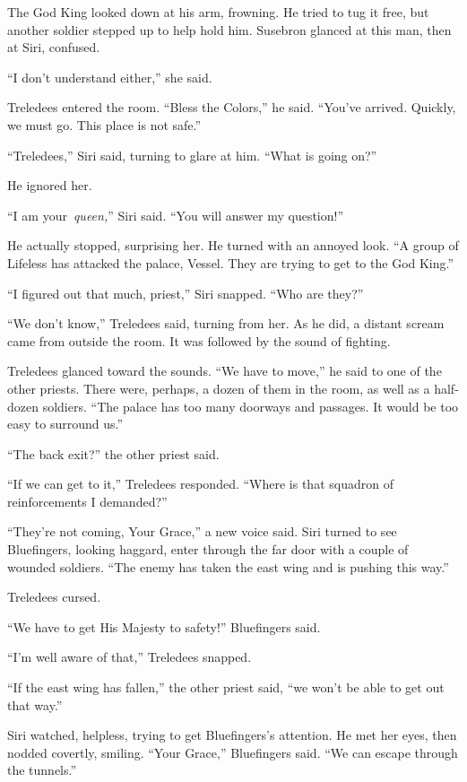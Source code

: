 The God King looked down at his arm, frowning. He tried to tug it free, but another soldier stepped up to help hold him. Susebron glanced at this man, then at Siri, confused.

“I don’t understand either,” she said.

Treledees entered the room. “Bless the Colors,” he said. “You’ve arrived. Quickly, we must go. This place is not safe.”

“Treledees,” Siri said, turning to glare at him. “What is going on?”

He ignored her.

“I am your~\textit{queen,}” Siri said. “You will answer my question!”

He actually stopped, surprising her. He turned with an annoyed look. “A group of Lifeless has attacked the palace, Vessel. They are trying to get to the God King.”

“I figured out that much, priest,” Siri snapped. “Who are they?”

“We don’t know,” Treledees said, turning from her. As he did, a distant scream came from outside the room. It was followed by the sound of fighting.

Treledees glanced toward the sounds. “We have to move,” he said to one of the other priests. There were, perhaps, a dozen of them in the room, as well as a half-dozen soldiers. “The palace has too many doorways and passages. It would be too easy to surround us.”

“The back exit?” the other priest said.

“If we can get to it,” Treledees responded. “Where is that squadron of reinforcements I demanded?”

“They’re not coming, Your Grace,” a new voice said. Siri turned to see Bluefingers, looking haggard, enter through the far door with a couple of wounded soldiers. “The enemy has taken the east wing and is pushing this way.”

Treledees cursed.

“We have to get His Majesty to safety!” Bluefingers said.

“I’m well aware of that,” Treledees snapped.

“If the east wing has fallen,” the other priest said, “we won’t be able to get out that way.”

Siri watched, helpless, trying to get Bluefingers’s attention. He met her eyes, then nodded covertly, smiling. “Your Grace,” Bluefingers said. “We can escape through the tunnels.”

